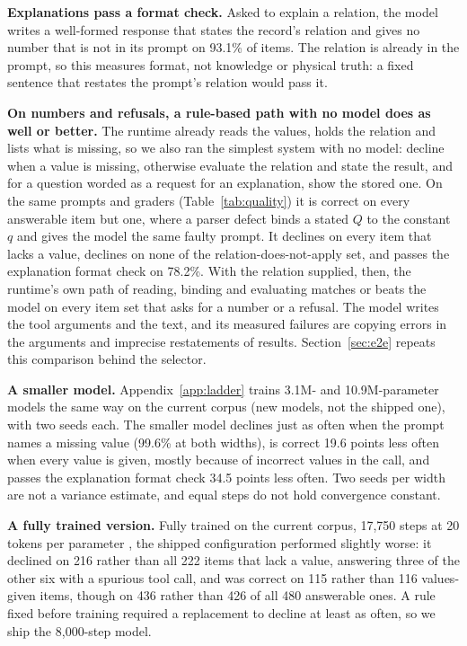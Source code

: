 \documentclass[10pt]{article}
\begin{document}
\textbf{Explanations pass a format check.} Asked to explain a relation, the model writes a
well-formed response that states the record's relation and gives no number that is not in its prompt
on 93.1\% of items. The relation is already in the prompt, so this measures format, not knowledge or
physical truth: a fixed sentence that restates the prompt's relation would pass it.

\textbf{On numbers and refusals, a rule-based path with no model does as well or better.} The runtime
already reads the values, holds the relation and lists what is missing, so we also ran the simplest
system with no model: decline when a value is missing, otherwise evaluate the relation and state the
result, and for a question worded as a request for an explanation, show the stored one. On the same
prompts and graders (Table~\ref{tab:quality}) it is correct on every answerable item but one, where a
parser defect binds a stated $Q$ to the constant $q$ and gives the model the same faulty prompt. It
declines on every item that lacks a value, declines on none of the relation-does-not-apply set, and
passes the explanation format check on 78.2\%. With the relation supplied, then, the runtime's own
path of reading, binding and evaluating matches or beats the model on every item set that asks for a
number or a refusal. The model writes the tool arguments and the text, and its measured failures are
copying errors in the arguments and imprecise restatements of results. Section~\ref{sec:e2e} repeats
this comparison behind the selector.

 \textbf{A smaller model.} Appendix~\ref{app:ladder} trains 3.1M- and 10.9M-parameter models the same way
on the current corpus (new models, not the shipped one), with two seeds each. The smaller model declines
just as often when the prompt names a missing value (99.6\% at both widths), is correct 19.6 points less
often when every value is given, mostly because of incorrect values in the call, and passes the explanation
format check 34.5 points less often. Two seeds per width are not a variance estimate, and equal
steps do not hold convergence constant.

\textbf{A fully trained version.} Fully trained on the current corpus, 17,750 steps at 20 tokens per parameter
\citep{hoffmann2022training}, the shipped configuration performed slightly worse: it declined on 216 rather
than all 222 items that lack a value, answering three of the other six with a spurious tool call, and was
correct on 115 rather than 116 values-given items, though on 436 rather than 426 of all 480 answerable ones.
A rule fixed before training required a replacement to decline at least as often, so we ship the 8,000-step model.
\end{document}
